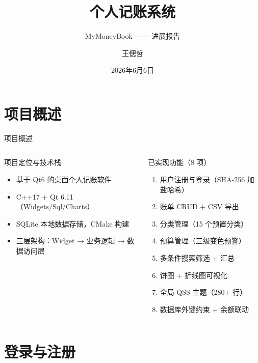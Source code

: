 \documentclass[12pt,aspectratio=169,UTF8]{ctexbeamer}
\title{个人记账系统}
\subtitle{MyMoneyBook —— 进展报告}
\author{王偲哲 \quad 2500017779}
\institute{程序设计实习 \quad 指导教师：贾川民}
\date{2026年6月6日}
\begin{document}
\begin{frame}
  \titlepage
\end{frame}

\section{项目概述}

\begin{frame}{项目概述}
  \begin{columns}[t]
    \begin{block}{项目定位与技术栈}
      \begin{itemize}
        \item 基于 Qt6 的桌面个人记账软件
        \item C++17 + Qt 6.11（Widgets/Sql/Charts）
        \item SQLite 本地数据存储，CMake 构建
        \item 三层架构：Widget → 业务逻辑 → 数据访问层
      \end{itemize}
    \end{block}

    \begin{block}{已实现功能（8 项）}
      \begin{enumerate}
        \item 用户注册与登录（SHA-256 加盐哈希）
        \item 账单 CRUD + CSV 导出
        \item 分类管理（15 个预置分类）
        \item 预算管理（三级变色预警）
        \item 多条件搜索筛选 + 汇总
        \item 饼图 + 折线图可视化
        \item 全局 QSS 主题（280+ 行）
        \item 数据库外键约束 + 余额联动
      \end{enumerate}
    \end{block}
  \end{columns}
\end{frame}

\section{登录与注册}
\end{document}
